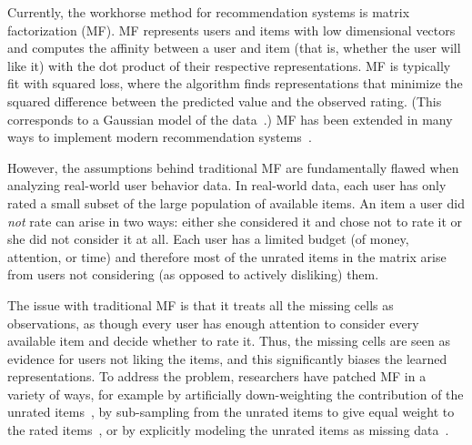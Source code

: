 \documentclass{sig-alternate}
\begin{document}


Currently, the workhorse method for recommendation systems is matrix
factorization (MF). MF represents users and items with low dimensional
vectors and computes the affinity between a user and item (that is,
whether the user will like it) with the dot product of their
respective representations.  MF is typically fit with squared loss,
where the algorithm finds representations that minimize the squared
difference between the predicted value and the observed rating.  (This
corresponds to a Gaussian model of the
data~\cite{Salakhutdinov:2008}.)  MF has been extended in many ways to
implement modern recommendation
systems~\cite{Dror:2012,Koren:2008,Rendle:2009,Stern:2009p9238}.

However, the assumptions behind traditional MF are fundamentally
flawed when analyzing real-world user behavior data.  In real-world
data, each user has only rated a small subset of the large population
of available items. An item a user did \textit{not} rate can arise in
two ways: either she considered it and chose not to rate it or she did
not consider it at all.  Each user has a limited budget (of money,
attention, or time) and therefore most of the unrated items in the
matrix arise from users not considering (as opposed to actively disliking) them.

The issue with traditional MF is that it treats all the missing cells
as observations, as though every user has enough attention to consider
every available item and decide whether to rate it.  Thus, the missing
cells are seen as evidence for users not liking the items, and this
significantly biases the learned representations.  To address the
problem, researchers have patched MF in a variety of ways, for example
by artificially down-weighting the contribution of the unrated items~\cite{Hu:2008p9402},
by sub-sampling from the unrated items to give equal weight to the
rated items~\cite{Gantner:2012p9364,Dror:2012a}, or by explicitly modeling the unrated
items as missing data~\cite{Paquet:2013p9197}.
\end{document}
